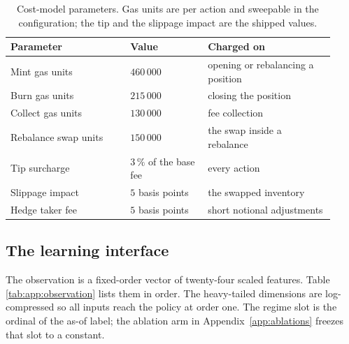 \begin{table}[tbp]
\caption{Cost-model parameters. Gas units are per action and sweepable in the
configuration; the tip and the slippage impact are the shipped values.}
\label{tab:app:gas}
\centering
\small
\begin{tabular}{@{}L{0.34\linewidth}L{0.22\linewidth}L{0.36\linewidth}@{}}
\toprule
\textbf{Parameter} & \textbf{Value} & \textbf{Charged on} \\
\midrule
Mint gas units & $460\,000$ & opening or rebalancing a position \\
Burn gas units & $215\,000$ & closing the position \\
Collect gas units & $130\,000$ & fee collection \\
Rebalance swap units & $150\,000$ & the swap inside a rebalance \\
Tip surcharge & $3\,\%$ of the base fee & every action \\
Slippage impact & $5$ basis points & the swapped inventory \\
Hedge taker fee & $5$ basis points & short notional adjustments \\
\bottomrule
\end{tabular}
\end{table}

\subsection{The learning interface}

The observation is a fixed-order vector of twenty-four scaled features. Table
\ref{tab:app:observation} lists them in order. The heavy-tailed dimensions are
log-compressed so all inputs reach the policy at order one. The regime slot
is the ordinal of the as-of label; the ablation arm in
Appendix~\ref{app:ablations} freezes that slot to a constant.

